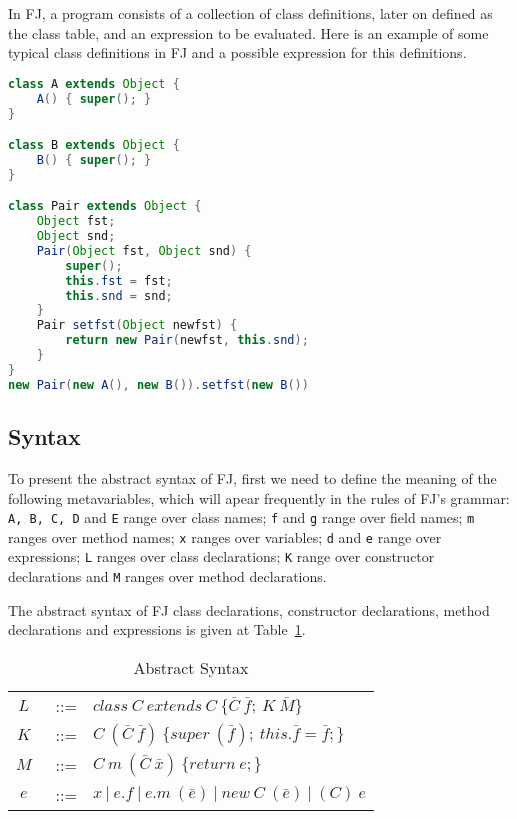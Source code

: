 In FJ, a program consists of a collection of class definitions, later on defined
as the class table, and an expression to be evaluated. Here is an example of some typical
class definitions in FJ and a possible expression for this definitions.

\begin{lstlisting}[language=Java]
class A extends Object {
    A() { super(); } 
} 

class B extends Object { 
    B() { super(); }
} 

class Pair extends Object { 
    Object fst; 
    Object snd;
    Pair(Object fst, Object snd) { 
        super(); 
        this.fst = fst; 
        this.snd = snd; 
    } 
    Pair setfst(Object newfst) { 
        return new Pair(newfst, this.snd); 
    } 
} 
new Pair(new A(), new B()).setfst(new B())
\end{lstlisting}

\subsection{Syntax}

To present the abstract syntax of FJ, first we need to define the meaning of the
following metavariables, which will apear frequently in the rules of FJ's
grammar: \texttt{A, B, C, D} and \texttt{E} range over class names; \texttt{f}
and \texttt{g} range over field names; \texttt{m} ranges over method names;
\texttt{x} ranges over variables; \texttt{d} and \texttt{e} range over
expressions; \texttt{L} ranges over class declarations; \texttt{K} range over
constructor declarations and \texttt{M} ranges over method declarations.

The abstract syntax of FJ class declarations, constructor declarations, method
declarations and expressions is given at Table~\ref{abstractsyntax}.

\begin{table}[h!]
\begin{tabular}{ccl}
    $L$&~::= & $class\ C~extends~C\ \{\bar{C} \ \bar{f};\ K\
\bar{M}\}$\\ 
    \vspace{0.8mm}
    $K$&~::= &
$C~(\bar{C}~\bar{f})\
\{super~(\bar{f});~this.\bar{f}=\bar{f};\}$\\
    \vspace{0.8mm}
$M$&~::= & $C~m~(\bar{C}~\bar{x})\ \{return~e;\}$\\
    \vspace{0.8mm}
$e$&~::= & $x~|~e.f~|~e.m~(\bar{e})~|~new~C~(\bar{e})~|~(C)~e$ \\
\end{tabular} \\
\vspace{1.5mm}
\caption{Abstract Syntax}
\label{abstractsyntax}
\end{table}


